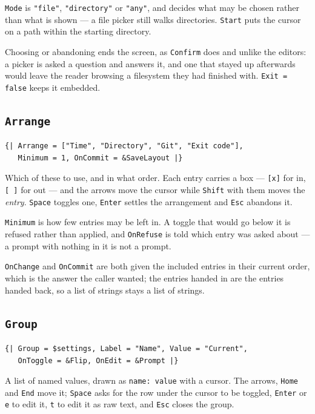 \documentclass[11pt,a4paper,twoside,openany]{book}
\newcommand{\code}[1]{\texttt{\small #1}}
\begin{document}
\code{Mode} is \code{"file"}, \code{"directory"} or \code{"any"}, and decides what
may be chosen rather than what is shown --- a file picker still walks directories.
\code{Start} puts the cursor on a path within the starting directory.

Choosing or abandoning ends the screen, as \code{Confirm} does and unlike the
editors: a picker is asked a question and answers it, and one that stayed up
afterwards would leave the reader browsing a filesystem they had finished with.
\code{Exit = false} keeps it embedded.

\subsection{\texttt{Arrange}}

\begin{lstlisting}
{| Arrange = ["Time", "Directory", "Git", "Exit code"],
   Minimum = 1, OnCommit = &SaveLayout |}
\end{lstlisting}

Which of these to use, and in what order. Each entry carries a box --- \code{[x]}
for in, \code{[ ]} for out --- and the arrows move the cursor while \code{Shift}
with them moves the \emph{entry}. \code{Space} toggles one, \code{Enter} settles
the arrangement and \code{Esc} abandons it.

\code{Minimum} is how few entries may be left in. A toggle that would go below it
is refused rather than applied, and \code{OnRefuse} is told which entry was asked
about --- a prompt with nothing in it is not a prompt.

\code{OnChange} and \code{OnCommit} are both given the included entries in their
current order, which is the answer the caller wanted; the entries handed in are the
entries handed back, so a list of strings stays a list of strings.

\subsection{\texttt{Group}}

\begin{lstlisting}
{| Group = $settings, Label = "Name", Value = "Current",
   OnToggle = &Flip, OnEdit = &Prompt |}
\end{lstlisting}

A list of named values, drawn as \code{name: value} with a cursor. The arrows,
\code{Home} and \code{End} move it; \code{Space} asks for the row under the cursor
to be toggled, \code{Enter} or \code{e} to edit it, \code{t} to edit it as raw text,
and \code{Esc} closes the group.
\end{document}
